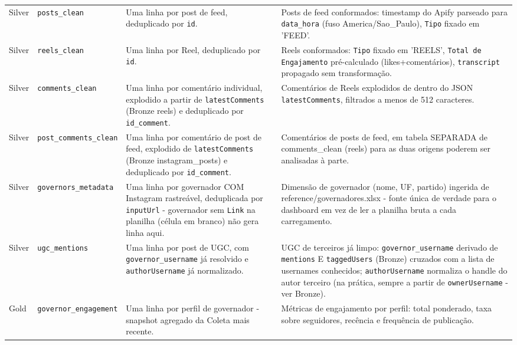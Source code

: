 \begin{footnotesize}
\begin{longtable}{p{1.2cm}p{3.4cm}p{3.6cm}p{6.0cm}}
Silver & \texttt{posts\_\allowbreak{}clean} & Uma linha por post de feed, deduplicado por \texttt{id}. & Posts de feed conformados: timestamp do Apify parseado para \texttt{data\_\allowbreak{}hora} (fuso America/\allowbreak{}Sao\_\allowbreak{}Paulo), \texttt{Tipo} fixado em 'FEED'. \\
Silver & \texttt{reels\_\allowbreak{}clean} & Uma linha por Reel, deduplicado por \texttt{id}. & Reels conformados: \texttt{Tipo} fixado em 'REELS', \texttt{Total de Engajamento} pré-calculado (likes+comentários), \texttt{transcript} propagado sem transformação. \\
Silver & \texttt{comments\_\allowbreak{}clean} & Uma linha por comentário individual, explodido a partir de \texttt{latestComments} (Bronze reels) e deduplicado por \texttt{id\_\allowbreak{}comment}. & Comentários de Reels explodidos de dentro do JSON \texttt{latestComments}, filtrados a menos de 512 caracteres. \\
Silver & \texttt{post\_\allowbreak{}comments\_\allowbreak{}clean} & Uma linha por comentário de post de feed, explodido de \texttt{latestComments} (Bronze instagram\_\allowbreak{}posts) e deduplicado por \texttt{id\_\allowbreak{}comment}. & Comentários de posts de feed, em tabela SEPARADA de comments\_\allowbreak{}clean (reels) para as duas origens poderem ser analisadas à parte. \\
Silver & \texttt{governors\_\allowbreak{}metadata} & Uma linha por governador COM Instagram rastreável, deduplicada por \texttt{inputUrl} - governador sem \texttt{Link} na planilha (célula em branco) não gera linha aqui. & Dimensão de governador (nome, UF, partido) ingerida de reference/\allowbreak{}governadores.xlsx - fonte única de verdade para o dashboard em vez de ler a planilha bruta a cada carregamento. \\
Silver & \texttt{ugc\_\allowbreak{}mentions} & Uma linha por post de UGC, com \texttt{governor\_\allowbreak{}username} já resolvido e \texttt{authorUsername} já normalizado. & UGC de terceiros já limpo: \texttt{governor\_\allowbreak{}username} derivado de \texttt{mentions} E \texttt{taggedUsers} (Bronze) cruzados com a lista de usernames conhecidos; \texttt{authorUsername} normaliza o handle do autor terceiro (na prática, sempre a partir de \texttt{ownerUsername} - ver Bronze). \\
Gold & \texttt{governor\_\allowbreak{}engagement} & Uma linha por perfil de governador - snapshot agregado da Coleta mais recente. & Métricas de engajamento por perfil: total ponderado, taxa sobre seguidores, recência e frequência de publicação. \\

\end{longtable}
\end{footnotesize}
